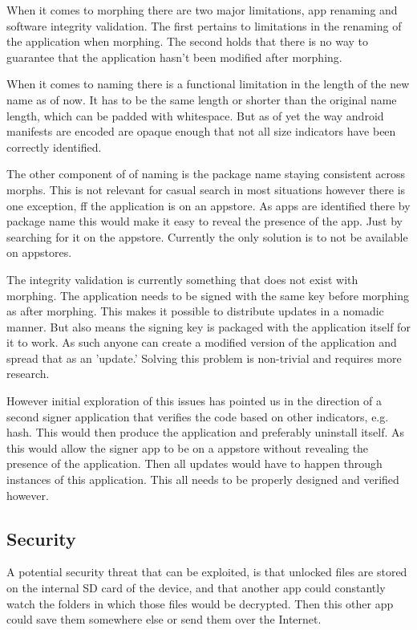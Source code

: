 \documentclass[twocolumn,english,compsoc,journal]{IEEEtran}
\begin{document}
When it comes to morphing there are two major limitations, app renaming
and software integrity validation. The first pertains to limitations in the renaming
of the application when morphing. The second holds that there is no way
to guarantee that the application hasn't been modified after morphing.

When it comes to naming there is a functional limitation in the length
of the new name as of now.
It has to be the same length or shorter than the original name length,
which can be padded with whitespace. But as of yet the way android
manifests are encoded are opaque enough that not all size indicators
have been correctly identified.

The other component of of naming is the package name staying consistent
across morphs. This is not relevant for casual search in most situations
however there is one exception, ff the application is on an appstore. As
apps are identified there by package name this would make it easy to
reveal the presence of the app. Just by searching for it on the appstore.
Currently the only solution is to not be available on appstores.

The integrity validation is currently something that does not exist with
morphing. The application needs to be signed with the same key
before morphing as after morphing. This makes it possible to distribute
updates in a nomadic manner. But also means the signing key is packaged
with the application itself for it to work. As such anyone can create a
modified version of the application and spread that as an 'update.'
Solving this problem is non-trivial and requires more research.

However initial exploration of this issues has pointed us in the direction
of a second signer application that verifies the code based on other
indicators, e.g. hash. This would then produce the application and
preferably uninstall itself. As this would allow the signer app to be
on a appstore without revealing the presence of the application. Then 
all updates would have to happen through instances of this application.
This all needs to be properly designed and verified however.

\subsection{Security}
A potential security threat that can be exploited, is that
unlocked files are stored on the internal SD card of the device,
and that another app could constantly watch the folders in which
those files would be decrypted. Then this other app could save
them somewhere else or send them over the Internet.
\end{document}
